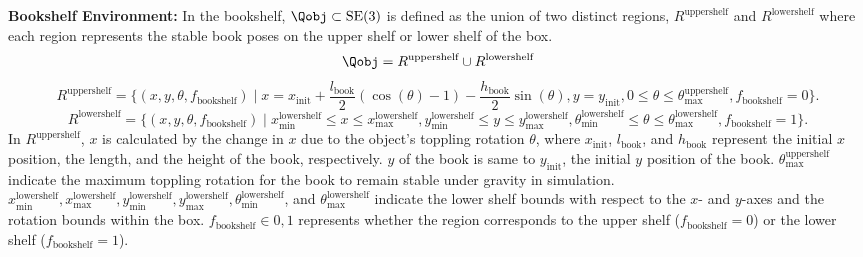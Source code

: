 

\textbf{Bookshelf Environment:} \label{env:bookshelf_region_descript} In the bookshelf, \(\Qobj \subset \text{SE(3)}\) is defined as the union of two distinct regions, $R^\text{uppershelf}$ and $R^\text{lowershelf}$ where each region represents the stable book poses on the upper shelf or lower shelf of the box.
\[
\Qobj = R^\text{uppershelf} \cup R^\text{lowershelf}
\]
\[
R^\text{uppershelf} = \{(x, y, \theta, f_{\text{bookshelf}}) \mid 
x = x_\text{init} + \frac{l_{\text{book}}}{2} (\cos(\theta) - 1) - \frac{h_{\text{book}}}{2} \sin(\theta), 
y = y_{\text{init}}, 
0 \le \theta \le \theta^{\text{uppershelf}}_{\text{max}}, f_{\text{bookshelf}}=0\}.
\]
\[
R^\text{lowershelf} = \{(x, y, \theta, f_{\text{bookshelf}}) \mid 
x^{\text{lowershelf}}_{\text{min}} \le x \le x^{\text{lowershelf}}_{\text{max}}, 
y^{\text{lowershelf}}_{\text{min}} \le y \le y^{\text{lowershelf}}_{\text{max}}, 
\theta^{\text{lowershelf}}_{\text{min}} \le \theta \le \theta^{\text{lowershelf}}_{\text{max}}, f_{\text{bookshelf}}=1\}.
\]
In $R^{\text{uppershelf}}$, $x$ is calculated by the change in $x$ due to the object's toppling rotation $\theta$, where $x_\text{init}$, $l_{\text{book}}$, and $h_{\text{book}}$ represent the initial $x$ position, the length, and the height of the book, respectively. $y$ of the book is same to $y_{\text{init}}$, the initial $y$ position of the book. $\theta^{\text{uppershelf}}_{\text{max}}$ indicate the maximum toppling rotation for the book to remain stable under gravity in simulation. $x^{\text{lowershelf}}_{\text{min}}, x^{\text{lowershelf}}_{\text{max}}, y^{\text{lowershelf}}_{\text{min}}, y^{\text{lowershelf}}_{\text{max}}, \theta^{\text{lowershelf}}_{\text{min}}$, and $\theta^{\text{lowershelf}}_{\text{max}}$ indicate the lower shelf bounds with respect to the $x$- and $y$-axes and the rotation bounds within the box. $f_{\text{bookshelf}} \in {0, 1}$ represents whether the region corresponds to the upper shelf ($f_{\text{bookshelf}} = 0$) or the lower shelf ($f_{\text{bookshelf}} = 1$).


